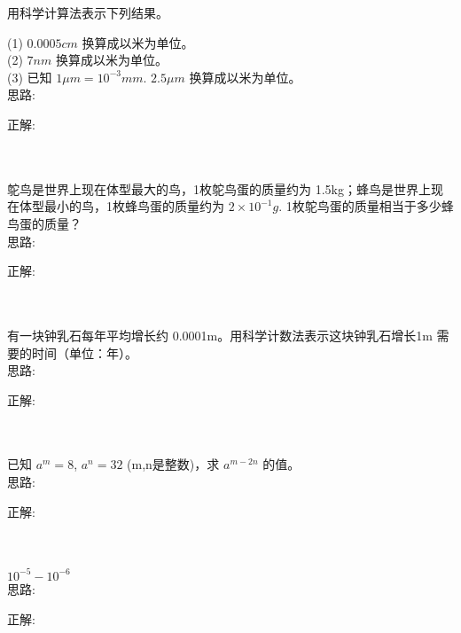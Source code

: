 \item {
    用科学计算法表示下列结果。
    
    (1) $ 0.0005 cm$ 换算成以米为单位。\\
    (2) $ 7 nm $ 换算成以米为单位。\\
    (3) 已知 $1 \mu m = 10^{-3}mm$. $ 2.5 \mu m$ 换算成以米为单位。
    \ifshowSolution
        \fangsong{}
        \\
        思路:

        正解: 
    \else
        \\ \\ \\
    \fi
}

\item {
    鸵鸟是世界上现在体型最大的鸟，1枚鸵鸟蛋的质量约为 1.5kg；蜂鸟是世界上现在体型最小的鸟，1枚蜂鸟蛋的质量约为 $2\times 10^{-1}g$. 1枚鸵鸟蛋的质量相当于多少蜂鸟蛋的质量？
    \ifshowSolution
        \fangsong{}
        \\
        思路:

        正解: 
    \else
        \\ \\ \\
    \fi
}

\item {
    有一块钟乳石每年平均增长约 0.0001m。用科学计数法表示这块钟乳石增长1m 需要的时间（单位：年）。
    \ifshowSolution
        \fangsong{}
        \\
        思路:

        正解: 
    \else
        \\ \\ \\
    \fi
}

\item {
    已知 $a^m = 8$, $a^n = 32$ (m,n是整数)，求 $a^{m-2n}$ 的值。
    \ifshowSolution
        \fangsong{}
        \\
        思路:

        正解: 
    \else
        \\ \\ \\
    \fi
}

\item {
    $ 10^{-5} - 10^{-6} $
    \ifshowSolution
        \fangsong{}
        \\
        思路:

        正解: 
    \else
        \\ \\ \\
    \fi
}

